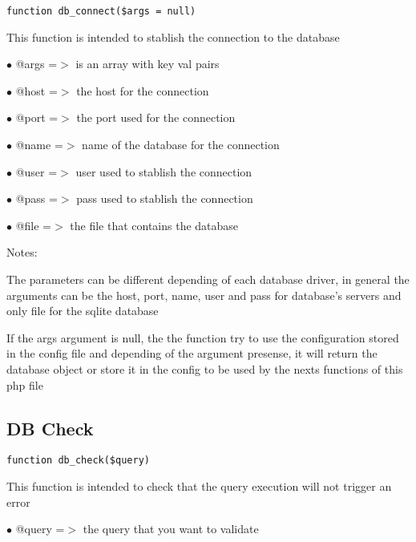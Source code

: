 \documentclass[a4paper]{book}
\begin{document}
\begin{lstlisting}
function db_connect($args = null)
\end{lstlisting}

This function is intended to stablish the connection to the database

\begin{compactitem}
\item[\color{myblue}$\bullet$] @args =$>$ is an array with key val pairs
\item[\color{myblue}$\bullet$] @host =$>$ the host for the connection
\item[\color{myblue}$\bullet$] @port =$>$ the port used for the connection
\item[\color{myblue}$\bullet$] @name =$>$ name of the database for the connection
\item[\color{myblue}$\bullet$] @user =$>$ user used to stablish the connection
\item[\color{myblue}$\bullet$] @pass =$>$ pass used to stablish the connection
\item[\color{myblue}$\bullet$] @file =$>$ the file that contains the database
\end{compactitem}

Notes:

The parameters can be different depending of each database driver, in general the arguments can
be the host, port, name, user and pass for database's servers and only file for the sqlite database

If the args argument is null, the the function try to use the configuration stored in the config file
and depending of the argument presense, it will return the database object or store it in the config
to be used by the nexts functions of this php file

\hypertarget{toc59}{}
\subsection{DB Check}

\begin{lstlisting}
function db_check($query)
\end{lstlisting}

This function is intended to check that the query execution will not trigger an error

\begin{compactitem}
\item[\color{myblue}$\bullet$] @query =$>$ the query that you want to validate
\end{compactitem}
\end{document}
